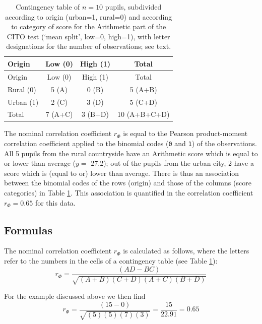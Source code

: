 \documentclass[
]{book}
\begin{document}
\begin{longtable}[]{@{}lccc@{}}
\caption{\label{tab:cito-contingency-table} Contingency table of \(n=10\) pupils, subdivided according
to origin (urban=1, rural=0) and according to category of score for the Arithmetic part of
the CITO test (`mean split', low=0, high=1), with letter designations for the number
of observations; see text.}\tabularnewline
\toprule\noalign{}
Origin & Low (0) & High (1) & Total \\
\midrule\noalign{}
\endfirsthead
\toprule\noalign{}
Origin & Low (0) & High (1) & Total \\
\midrule\noalign{}
\endhead
\bottomrule\noalign{}
\endlastfoot
Rural (0) & 5 (A) & 0 (B) & 5 (A+B) \\
Urban (1) & 2 (C) & 3 (D) & 5 (C+D) \\
Total & 7 (A+C) & 3 (B+D) & 10 (A+B+C+D) \\
\end{longtable}

The nominal correlation coefficient \(r_\Phi\) is equal to the Pearson
product-moment correlation coefficient applied to the binomial codes
(\texttt{0} and \texttt{1}) of the observations. All 5 pupils from the rural countryside
have an Arithmetic score which is equal to or lower than average
(\(\overline{y}=\) 27.2); out of the pupils from the urban city, 2 have a
score which is (equal to or) lower than average. There is thus an association\\
between the binomial codes of the rows (origin) and those of the columns
(score categories) in Table \ref{tab:cito-contingency-table}.
This association is quantified in the
correlation coefficient \(r_\Phi=0.65\) for this data.

\subsection{Formulas}\label{formulas-5}

The nominal correlation coefficient \(r_\Phi\) is calculated as follows,
where the letters refer to the numbers in the cells of a contingency table
(see Table \ref{tab:cito-contingency-table}):
\begin{equation}
    r_\Phi = \frac{(AD-BC)}{\sqrt{(A+B)(C+D)(A+C)(B+D)}}
  \label{eq:phi}
\end{equation}

For the example discussed above we then find
\[
    r_\Phi = \frac{(15-0)}{\sqrt{(5)(5)(7)(3)}} = \frac{15}{22.91} = 0.65
\]
\end{document}
